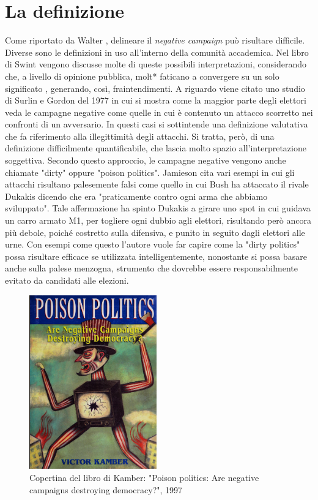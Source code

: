 \section{La definizione}
Come riportato da Walter \citep{walter2014}, delineare il \textit{negative campaign} può risultare difficile. Diverse sono le definizioni in uso all'interno della  comunità accademica. Nel libro di Swint \citep{swint1998} vengono discusse molte di queste possibili interpretazioni, considerando che, a livello di opinione pubblica, molt* faticano a convergere su un solo  significato , generando, così,  fraintendimenti. A riguardo viene citato uno studio di Surlin e Gordon del 1977 \citep{surlin1977} in cui si mostra come la maggior parte degli elettori veda le campagne negative come quelle in cui è contenuto un attacco scorretto nei confronti di un avversario. In questi casi si sottintende una definizione valutativa che fa riferimento alla illegittimità degli attacchi. Si tratta, però, di una definizione difficilmente quantificabile, che lascia molto spazio all'interpretazione soggettiva. Secondo questo approccio, le campagne negative vengono anche chiamate "dirty" oppure "poison politics". Jamieson \citep{jamieson1993} cita vari esempi in cui gli attacchi risultano palesemente falsi come quello in cui Bush ha attaccato il rivale Dukakis dicendo che era "praticamente contro ogni arma che abbiamo sviluppato". Tale affermazione ha spinto Dukakis a girare uno spot in cui guidava un carro armato M1, per togliere ogni dubbio agli elettori, risultando però ancora più debole, poiché costretto sulla difensiva, e punito in seguito dagli elettori alle urne. Con esempi come questo l'autore vuole far capire come la "dirty politics" possa risultare efficace se utilizzata intelligentemente, nonostante si possa basare anche sulla palese menzogna, strumento che dovrebbe essere responsabilmente evitato da candidati alle elezioni.
\begin{figure}
	\centering
	\includegraphics[width=5.5cm]{figures/poison}
	\caption{Copertina del libro di Kamber: "Poison politics: Are negative campaigns destroying democracy?", 1997}
	\label{poison3}
\end{figure}

